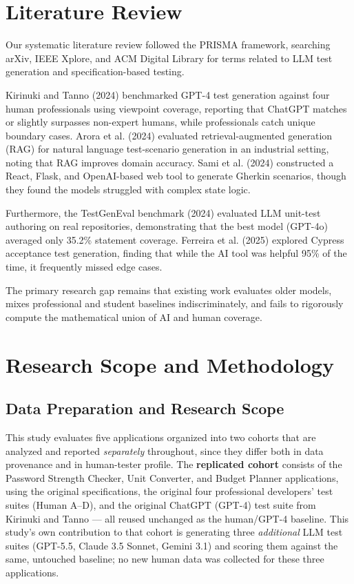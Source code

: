 \documentclass[conference]{IEEEtran}
\begin{document}
\section{Literature Review}
Our systematic literature review followed the PRISMA framework, searching arXiv, IEEE Xplore, and ACM Digital Library for terms related to LLM test generation and specification-based testing. 

Kirinuki and Tanno (2024) benchmarked GPT-4 test generation against four human professionals using viewpoint coverage, reporting that ChatGPT matches or slightly surpasses non-expert humans, while professionals catch unique boundary cases. Arora et al. (2024) evaluated retrieval-augmented generation (RAG) for natural language test-scenario generation in an industrial setting, noting that RAG improves domain accuracy. Sami et al. (2024) constructed a React, Flask, and OpenAI-based web tool to generate Gherkin scenarios, though they found the models struggled with complex state logic. 

Furthermore, the TestGenEval benchmark (2024) evaluated LLM unit-test authoring on real repositories, demonstrating that the best model (GPT-4o) averaged only 35.2\% statement coverage. Ferreira et al. (2025) explored Cypress acceptance test generation, finding that while the AI tool was helpful 95\% of the time, it frequently missed edge cases. 

The primary research gap remains that existing work evaluates older models, mixes professional and student baselines indiscriminately, and fails to rigorously compute the mathematical union of AI and human coverage.

\section{Research Scope and Methodology}

\subsection{Data Preparation and Research Scope}
This study evaluates five applications organized into two cohorts that are analyzed and reported \emph{separately} throughout, since they differ both in data provenance and in human-tester profile. The \textbf{replicated cohort} consists of the Password Strength Checker, Unit Converter, and Budget Planner applications, using the original specifications, the original four professional developers' test suites (Human A--D), and the original ChatGPT (GPT-4) test suite from Kirinuki and Tanno --- all reused unchanged as the human/GPT-4 baseline. This study's own contribution to that cohort is generating three \emph{additional} LLM test suites (GPT-5.5, Claude 3.5 Sonnet, Gemini 3.1) and scoring them against the same, untouched baseline; no new human data was collected for these three applications.
\end{document}
